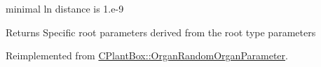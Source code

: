 minimal ln distance is 1.\+e-\/9

\begin{DoxyReturn}{Returns}
Specific root parameters derived from the root type parameters 
\end{DoxyReturn}


Reimplemented from \hyperlink{classCPlantBox_1_1OrganRandomOrganParameter}{C\+Plant\+Box\+::\+Organ\+Random\+Organ\+Parameter}.

\mbox{\label{classCPlantBox_1_1LeafRandomOrganParameter_acce175a540cc9cde00344a6336246a64}} 
